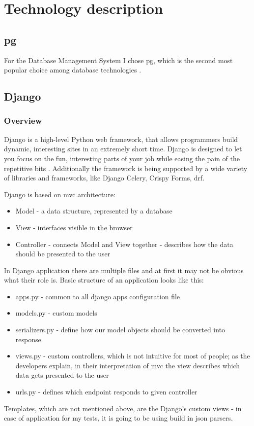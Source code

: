 
\chapter{Technology description}


\section{\acrlong{pg}}

For the Database Management System I chose \acrlong{pg}, which is the second most popular choice among database technologies \cite{devSurveyDb}.

\section{Django}

\subsection{Overview}
Django is a high-level Python web framework, that allows programmers build dynamic, interesting sites in an extremely short time. Django is designed to let you focus on the fun, interesting parts of your job while easing the pain of the repetitive bits \cite{djangobook}. Additionally the framework is being supported by a wide variety of libraries and frameworks, like Django Celery, Crispy Forms, \acrfull{drf}.

Django is based on \acrshort{mvc} architecture:
\begin{itemize}
    \item Model - a data structure, represented by a database
    \item View - interfaces visible in the browser
    \item Controller - connects Model and View together - describes how the data should be presented to the user
\end{itemize}
In Django application there are multiple files and at first it may not be obvious what their role is. Basic structure of an application looks like this:
\begin{itemize}
    \item apps.py - common to all django apps configuration file
    \item models.py - custom models
    \item serializers.py - define how our model objects should be converted into response
    \item views.py - custom controllers, which is not intuitive for most of people; as the developers explain, in their interpretation of \acrshort{mvc} the view describes which data gets presented to the user \cite{djangoWhyViews}
    \item urls.py - defines which endpoint responds to given controller
\end{itemize}
Templates, which are not mentioned above, are the Django's custom views - in case of application for my tests, it is going to be using build in json parsers.

